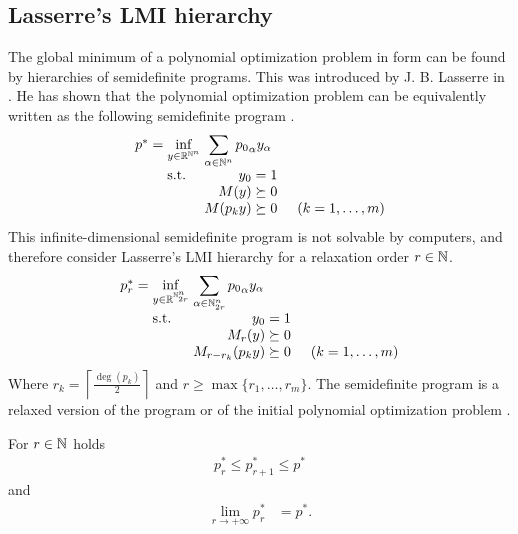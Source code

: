 \subsection{Lasserre's LMI hierarchy}
The global minimum of a polynomial optimization problem in form  can be found by hierarchies of semidefinite programs.
This was introduced by J. B. Lasserre in \cite{Lasserre}.
He has shown that the polynomial optimization problem can be equivalently written as the following semidefinite program .
\begin{align}
  \arraycolsep=1.4pt
  \begin{array}{rclrcl@{\hskip0.5cm}l}
    p^* &=& \displaystyle \inf_{y\in\R^{\N^n}} & \multicolumn{3}{l}{\displaystyle \sum_{\alpha\in\N^n}{p_0}_\alpha y_\alpha} \\
    && \text{s.t.} & y_0 &=& 1\\
    &&& M(y) &\succeq& 0\\
    &&& M(p_ky) &\succeq& 0 & (k = 1,\ldots,m)
  \end{array}\labeleq{POP:opt:SDP}
\end{align}
This infinite-dimensional semidefinite program is not solvable by computers, and therefore consider Lasserre's LMI hierarchy  for a relaxation order $r\in\mathbb{N}$.
\begin{align}
  \arraycolsep=1.4pt
  \begin{array}{rclrcl@{\hskip0.5cm}l}
    p_r^* &=& \displaystyle \inf_{y\in\R^{\N^n_{2r}}} & \multicolumn{2}{l}{\displaystyle \sum_{\alpha\in\N^n_{2r}}{p_0}_\alpha y_\alpha} \\
    && \text{s.t.} & y_0 &=& 1\\
    &&& M_r(y) &\succeq& 0\\
    &&& M_{r-r_k}(p_ky) &\succeq& 0 & (k = 1,\ldots,m)
  \end{array}\labeleq{POP:opt:SDPr}
\end{align}
Where $r_k = \left\lceil\frac{\deg(p_k)}{2}\right\rceil$ and $r\geq\max\{r_1, \ldots, r_m\}$.
The semidefinite program  is a relaxed version of the program  or of the initial polynomial optimization problem .

\begin{theorem}
  For $r\in\mathbb{N}$ holds
  \begin{align}
    p^*_r \leq p^*_{r+1} \leq p^*
  \end{align}
  and
  \begin{align}
    \lim_{r\rightarrow+\infty}p^*_r &= p^*.
  \end{align}
\end{theorem}


